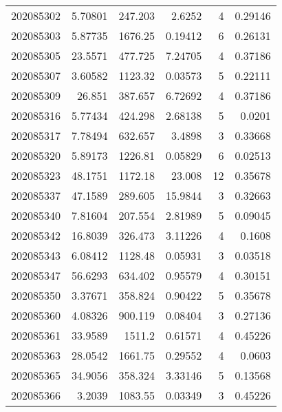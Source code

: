 \begin{tabular}{rrrrrr}
 202085302 &          5.70801 &      247.203  &            2.6252  &           4 & 0.29146 \\
 202085303 &          5.87735 &     1676.25   &            0.19412 &           6 & 0.26131 \\
 202085305 &         23.5571  &      477.725  &            7.24705 &           4 & 0.37186 \\
 202085307 &          3.60582 &     1123.32   &            0.03573 &           5 & 0.22111 \\
 202085309 &         26.851   &      387.657  &            6.72692 &           4 & 0.37186 \\
 202085316 &          5.77434 &      424.298  &            2.68138 &           5 & 0.0201  \\
 202085317 &          7.78494 &      632.657  &            3.4898  &           3 & 0.33668 \\
 202085320 &          5.89173 &     1226.81   &            0.05829 &           6 & 0.02513 \\
 202085323 &         48.1751  &     1172.18   &           23.008   &          12 & 0.35678 \\
 202085337 &         47.1589  &      289.605  &           15.9844  &           3 & 0.32663 \\
 202085340 &          7.81604 &      207.554  &            2.81989 &           5 & 0.09045 \\
 202085342 &         16.8039  &      326.473  &            3.11226 &           4 & 0.1608  \\
 202085343 &          6.08412 &     1128.48   &            0.05931 &           3 & 0.03518 \\
 202085347 &         56.6293  &      634.402  &            0.95579 &           4 & 0.30151 \\
 202085350 &          3.37671 &      358.824  &            0.90422 &           5 & 0.35678 \\
 202085360 &          4.08326 &      900.119  &            0.08404 &           3 & 0.27136 \\
 202085361 &         33.9589  &     1511.2    &            0.61571 &           4 & 0.45226 \\
 202085363 &         28.0542  &     1661.75   &            0.29552 &           4 & 0.0603  \\
 202085365 &         34.9056  &      358.324  &            3.33146 &           5 & 0.13568 \\
 202085366 &          3.2039  &     1083.55   &            0.03349 &           3 & 0.45226 \\

\end{tabular}
